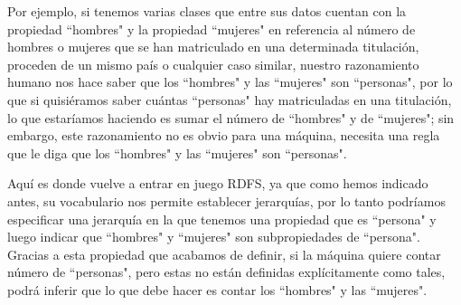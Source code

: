 \bigskip
Por ejemplo, si tenemos varias clases que entre sus datos cuentan con la propiedad ``hombres" y la propiedad ``mujeres" en referencia al número de hombres o mujeres que se han matriculado en una determinada titulación, proceden de un mismo país o cualquier caso similar, nuestro razonamiento humano nos hace saber que los ``hombres" y las ``mujeres" son ``personas", por lo que si quisiéramos saber cuántas ``personas" hay matriculadas en una titulación, lo que estaríamos haciendo es sumar el número de ``hombres" y de ``mujeres"; sin embargo, este razonamiento no es obvio para una máquina, necesita una regla que le diga que los ``hombres" y las ``mujeres" son ``personas".

\bigskip
Aquí es donde vuelve a entrar en juego RDFS, ya que como hemos indicado antes, su vocabulario nos permite establecer jerarquías, por lo tanto podríamos especificar una jerarquía en la que tenemos una propiedad que es ``persona" y luego indicar que ``hombres" y ``mujeres" son subpropiedades de ``persona". Gracias a esta propiedad que acabamos de definir, si la máquina quiere contar número de ``personas", pero estas no están definidas explícitamente como tales, podrá inferir que lo que debe hacer es contar los ``hombres" y las ``mujeres".